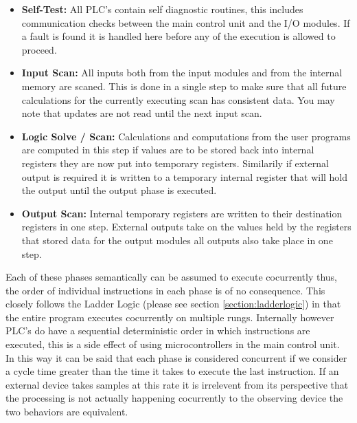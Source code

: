 \begin{itemize}
	\item\textbf{Self-Test:} All PLC's contain self diagnostic routines, this includes communication checks between the main control unit and the I/O modules. If a fault is found it is handled here before any of the execution is allowed to proceed.
	\item\textbf{Input Scan:} All inputs both from the input modules and from the internal memory are scaned. This is done in a single step to make sure that all future calculations for the currently executing scan has consistent data. You may note that updates are not read until the next input scan.
	\item\textbf{Logic Solve / Scan:} Calculations and computations from the user programs are computed in this step if values are to be stored back into internal registers they are now put into temporary registers. Similarily if external output is required it is written to a temporary internal register that will hold the output until the output phase is executed.
	\item\textbf{Output Scan:} Internal temporary registers are written to their destination registers in one step. External outputs take on the values held by the registers that stored data for the output modules all outputs also take place in one step.
\end{itemize}

Each of these phases semantically can be assumed to execute cocurrently thus, the order of individual instructions in each phase is of no consequence. This closely follows the Ladder Logic (please see section \ref{section:ladderlogic}) in that the entire program executes cocurrently on multiple rungs. Internally however PLC's do have a sequential deterministic order in which instructions are executed, this is a side effect of using microcontrollers in the main control unit. In this way it can be said that each phase is considered concurrent if we consider a cycle time greater than the time it takes to execute the last instruction. If an external device takes samples at this rate it is irrelevent from its perspective that the processing is not actually happening cocurrently to the observing device the two behaviors are equivalent.

